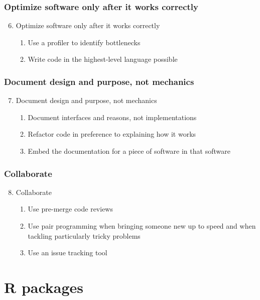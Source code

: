 \documentclass{beamer}
\begin{document}
\begin{frame}
	\frametitle{Optimize software only after it works correctly}
	\begin{enumerate}
		\setcounter{enumi}{5}
		\item Optimize software only after it works correctly
		\begin{enumerate}
			\item Use a profiler to identify bottlenecks
			\item Write code in the highest-level language possible
		\end{enumerate}
	\end{enumerate}
\end{frame}

\begin{frame}
	\frametitle{Document design and purpose, not mechanics}
	\begin{enumerate}
		\setcounter{enumi}{6}
		\item Document design and purpose, not mechanics
		\begin{enumerate}
			\item Document interfaces and reasons, not implementations
			\item Refactor code in preference to explaining how it works
			\item Embed the documentation for a piece of software in that 
			software
		\end{enumerate}
	\end{enumerate}
\end{frame}

\begin{frame}
	\frametitle{Collaborate}
	\begin{enumerate}
		\setcounter{enumi}{7}
		\item Collaborate
		\begin{enumerate}
			\item Use pre-merge code reviews
			\item Use pair programming when bringing someone new up to speed 
			and when tackling particularly tricky problems
			\item Use an issue tracking tool
		\end{enumerate}
	\end{enumerate}
\end{frame}

\section{R packages} 
\end{document}

